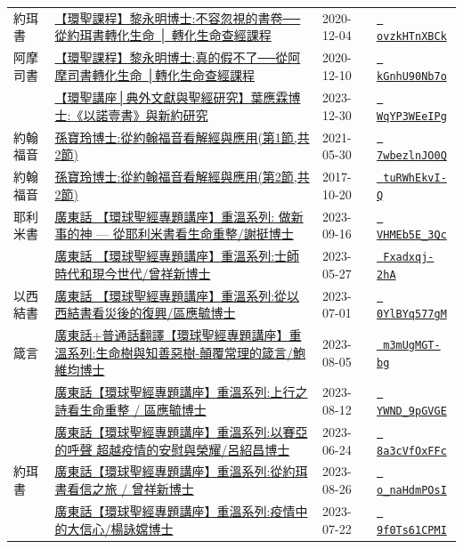 \documentclass{book}
\begin{document}
{\begin{xltabular}{\textwidth}{|p{0.15\textwidth} p{0.6\textwidth}|p{0.07\textwidth} p{0.1\textwidth}|}
約珥書   & \hyperref[sec:ovzkHTnXBCk]{【環聖課程】黎永明博士:不容忽視的書卷──從約珥書轉化生命 │ 轉化生命查經課程} & 2020-12-04 & \href{https://youtube.com/watch?v=ovzkHTnXBCk}{\texttt{ ovzkHTnXBCk}} \\
阿摩司書   & \hyperref[sec:kGnhU90Nb7o]{【環聖課程】黎永明博士:真的假不了──從阿摩司書轉化生命 │轉化生命查經課程} & 2020-12-10 & \href{https://youtube.com/watch?v=kGnhU90Nb7o}{\texttt{ kGnhU90Nb7o}} \\
    & \hyperref[sec:WqYP3WEeIPg]{【環聖講座│典外文獻與聖經研究】葉應霖博士:《以諾壹書》與新約研究} & 2023-12-30 & \href{https://youtube.com/watch?v=WqYP3WEeIPg}{\texttt{ WqYP3WEeIPg}} \\
約翰福音   & \hyperref[sec:7wbezlnJO0Q]{孫寶玲博士:從約翰福音看解經與應用(第1節,共2節)} & 2021-05-30 & \href{https://youtube.com/watch?v=7wbezlnJO0Q}{\texttt{ 7wbezlnJO0Q}} \\
約翰福音   & \hyperref[sec:tuRWhEkvI_Q]{孫寶玲博士:從約翰福音看解經與應用(第2節,共2節)} & 2017-10-20 & \href{https://youtube.com/watch?v=tuRWhEkvI-Q}{\texttt{ tuRWhEkvI-Q}} \\
耶利米書   & \hyperref[sec:VHMEb5E_3Qc]{廣東話 【環球聖經專題講座】重溫系列: 做新事的神 — 從耶利米書看生命重整/謝挺博士} & 2023-09-16 & \href{https://youtube.com/watch?v=VHMEb5E_3Qc}{\texttt{ VHMEb5E\_3Qc}} \\
    & \hyperref[sec:Fxadxqj_2hA]{廣東話 【環球聖經專題講座】重溫系列:士師時代和現今世代/曾祥新博士} & 2023-05-27 & \href{https://youtube.com/watch?v=Fxadxqj-2hA}{\texttt{ Fxadxqj-2hA}} \\
以西結書   & \hyperref[sec:0YlBYq577gM]{廣東話 【環球聖經專題講座】重溫系列:從以西結書看災後的復興/區應毓博士} & 2023-07-01 & \href{https://youtube.com/watch?v=0YlBYq577gM}{\texttt{ 0YlBYq577gM}} \\
箴言   & \hyperref[sec:m3mUgMGT_bg]{廣東話+普通話翻譯【環球聖經專題講座】重溫系列:生命樹與知善惡樹-顛覆常理的箴言/鮑維均博士} & 2023-08-05 & \href{https://youtube.com/watch?v=m3mUgMGT-bg}{\texttt{ m3mUgMGT-bg}} \\
    & \hyperref[sec:YWND_9pGVGE]{廣東話【環球聖經專題講座】重溫系列:上行之詩看生命重整 / 區應毓博士} & 2023-08-12 & \href{https://youtube.com/watch?v=YWND_9pGVGE}{\texttt{ YWND\_9pGVGE}} \\
    & \hyperref[sec:8a3cVfOxFFc]{廣東話【環球聖經專題講座】重溫系列:以賽亞的呼聲 超越疫情的安慰與榮耀/呂紹昌博士} & 2023-06-24 & \href{https://youtube.com/watch?v=8a3cVfOxFFc}{\texttt{ 8a3cVfOxFFc}} \\
約珥書   & \hyperref[sec:o_naHdmPOsI]{廣東話【環球聖經專題講座】重溫系列:從約珥書看信之旅 / 曾祥新博士} & 2023-08-26 & \href{https://youtube.com/watch?v=o_naHdmPOsI}{\texttt{ o\_naHdmPOsI}} \\
    & \hyperref[sec:9f0Ts61CPMI]{廣東話【環球聖經專題講座】重溫系列:疫情中的大信心/楊詠嫦博士} & 2023-07-22 & \href{https://youtube.com/watch?v=9f0Ts61CPMI}{\texttt{ 9f0Ts61CPMI}} \\
\end{xltabular}
}
\newpage
\end{document}
